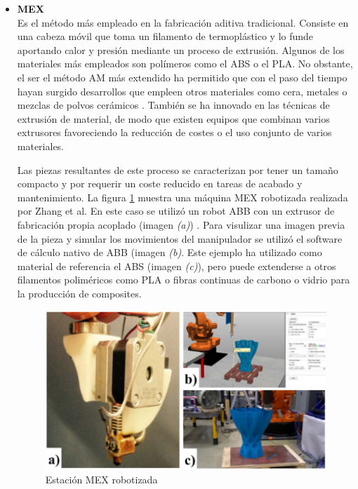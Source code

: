 \begin{itemize}
    \item \textbf{\acrfull{MEX}}\\
    Es el método más empleado en la fabricación aditiva tradicional. Consiste en una cabeza móvil que toma un filamento de termoplástico y lo funde aportando calor y presión mediante un proceso de extrusión. Algunos de los materiales más empleados son polímeros como el \acrshort{ABS} o el \acrshort{PLA}. No obstante, el ser el método \acrshort{AM} más extendido ha permitido que con el paso del tiempo hayan surgido desarrollos que empleen otros materiales como cera, metales o mezclas de polvos cerámicos \cite{Kruth1998}. También se ha innovado en las técnicas de extrusión de material, de modo que existen equipos que combinan varios extrusores favoreciendo la reducción de costes o el uso conjunto de varios materiales.

    Las piezas resultantes de este proceso se caracterizan por tener un tamaño compacto y por requerir un coste reducido en tareas de acabado y mantenimiento. La figura \ref{fig:zhang_2016_ejemplo_mex_robot} muestra una máquina \acrshort{MEX} robotizada realizada por Zhang et al. \cite{Zhang_2016} En este caso se utilizó un robot ABB  con un extrusor de fabricación propia acoplado (imagen \textit{(a)}) . Para visulizar una imagen previa de la pieza y simular los movimientos del manipulador se utilizó el software de cálculo nativo de ABB (imagen \textit{(b)}. Este ejemplo ha utilizado como material de referencia el \acrshort{ABS} (imagen \textit{(c)}), pero puede extenderse a otros filamentos poliméricos como \acrshort{PLA} o fibras continuas de carbono o vidrio para la producción de composites.

    \begin{figure}[h!]
        \centering
        \includegraphics[scale=0.4]{figuras/zhang_2016_ejemplo_mex_robot.png}
        \caption{Estación \acrshort{MEX} robotizada \cite{Zhang_2016}}
        \label{fig:zhang_2016_ejemplo_mex_robot}
    \end{figure}


\end{itemize}
